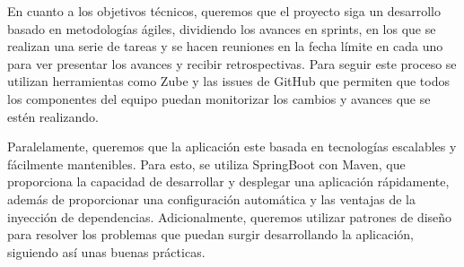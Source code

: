 En cuanto a los objetivos técnicos, queremos que el proyecto siga un desarrollo basado en metodologías ágiles, dividiendo los avances en sprints, en los que se realizan una serie de tareas y se hacen reuniones en la fecha límite en cada uno para ver presentar los avances y recibir retrospectivas. Para seguir este proceso se utilizan herramientas como Zube y las issues de GitHub que permiten que todos los componentes del equipo puedan monitorizar los cambios y avances que se estén realizando. 

Paralelamente, queremos que la aplicación este basada en tecnologías escalables y fácilmente mantenibles. Para esto, se utiliza SpringBoot con Maven, que proporciona la capacidad de desarrollar y desplegar una aplicación rápidamente, además de proporcionar una configuración automática y las ventajas de la inyección de dependencias. Adicionalmente, queremos utilizar patrones de diseño para resolver los problemas que puedan surgir desarrollando la aplicación, siguiendo así unas buenas prácticas.